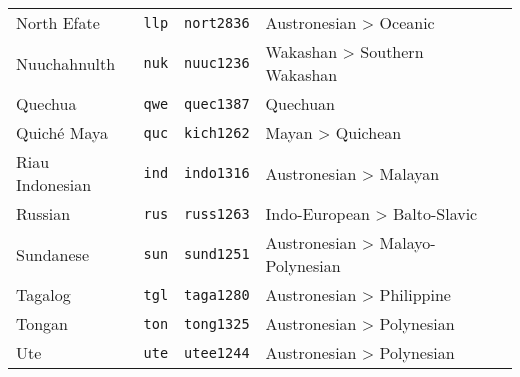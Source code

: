 \begin{longtable}[h]{ l l l l l }
  North Efate                      & \texttt{llp}       & \texttt{nort2836}   & Austronesian > Oceanic\\
  Nuuchahnulth                     & \texttt{nuk}       & \texttt{nuuc1236}   & Wakashan > Southern Wakashan\\
  Quechua                          & \texttt{qwe}       & \texttt{quec1387}   & Quechuan\\
  Quiché Maya                      & \texttt{quc}       & \texttt{kich1262}   & Mayan > Quichean\\
  Riau Indonesian                  & \texttt{ind}       & \texttt{indo1316}   & Austronesian > Malayan\\
  Russian                          & \texttt{rus}       & \texttt{russ1263}   & Indo-European > Balto-Slavic\\
  Sundanese                        & \texttt{sun}       & \texttt{sund1251}   & Austronesian > Malayo-Polynesian\\
  Tagalog                          & \texttt{tgl}       & \texttt{taga1280}   & Austronesian > Philippine\\
  Tongan                           & \texttt{ton}       & \texttt{tong1325}   & Austronesian > Polynesian\\
  Ute                              & \texttt{ute}       & \texttt{utee1244}   & Austronesian > Polynesian\\
\end{longtable}
